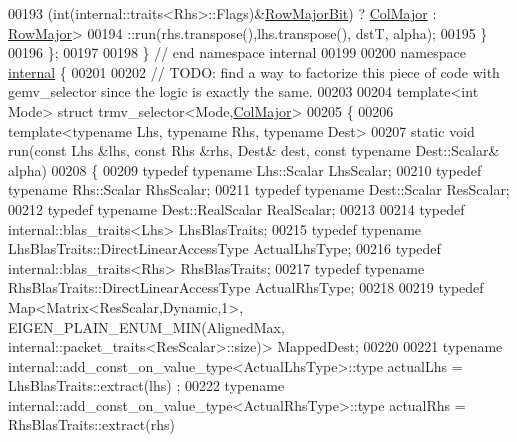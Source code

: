 \begin{DoxyCode}
00193                             (int(internal::traits<Rhs>::Flags)&\hyperlink{group__flags_gae4f56c2a60bbe4bd2e44c5b19cbe8762}{RowMajorBit}) ? 
      \hyperlink{group__enums_ggaacded1a18ae58b0f554751f6cdf9eb13a0cbd4bdd0abcfc0224c5fcb5e4f6669a}{ColMajor} : \hyperlink{group__enums_ggaacded1a18ae58b0f554751f6cdf9eb13acfcde9cd8677c5f7caf6bd603666aae3}{RowMajor}>
00194             ::run(rhs.transpose(),lhs.transpose(), dstT, alpha);
00195   \}
00196 \};
00197 
00198 \} \textcolor{comment}{// end namespace internal}
00199 
00200 \textcolor{keyword}{namespace }\hyperlink{namespaceinternal}{internal} \{
00201 
00202 \textcolor{comment}{// TODO: find a way to factorize this piece of code with gemv\_selector since the logic is exactly the same.}
00203   
00204 \textcolor{keyword}{template}<\textcolor{keywordtype}{int} Mode> \textcolor{keyword}{struct }trmv\_selector<Mode,\hyperlink{group__enums_ggaacded1a18ae58b0f554751f6cdf9eb13a0cbd4bdd0abcfc0224c5fcb5e4f6669a}{ColMajor}>
00205 \{
00206   \textcolor{keyword}{template}<\textcolor{keyword}{typename} Lhs, \textcolor{keyword}{typename} Rhs, \textcolor{keyword}{typename} Dest>
00207   \textcolor{keyword}{static} \textcolor{keywordtype}{void} run(\textcolor{keyword}{const} Lhs &lhs, \textcolor{keyword}{const} Rhs &rhs, Dest& dest, \textcolor{keyword}{const} \textcolor{keyword}{typename} Dest::Scalar& alpha)
00208   \{
00209     \textcolor{keyword}{typedef} \textcolor{keyword}{typename} Lhs::Scalar      LhsScalar;
00210     \textcolor{keyword}{typedef} \textcolor{keyword}{typename} Rhs::Scalar      RhsScalar;
00211     \textcolor{keyword}{typedef} \textcolor{keyword}{typename} Dest::Scalar     ResScalar;
00212     \textcolor{keyword}{typedef} \textcolor{keyword}{typename} Dest::RealScalar RealScalar;
00213     
00214     \textcolor{keyword}{typedef} internal::blas\_traits<Lhs> LhsBlasTraits;
00215     \textcolor{keyword}{typedef} \textcolor{keyword}{typename} LhsBlasTraits::DirectLinearAccessType ActualLhsType;
00216     \textcolor{keyword}{typedef} internal::blas\_traits<Rhs> RhsBlasTraits;
00217     \textcolor{keyword}{typedef} \textcolor{keyword}{typename} RhsBlasTraits::DirectLinearAccessType ActualRhsType;
00218     
00219     \textcolor{keyword}{typedef} Map<Matrix<ResScalar,Dynamic,1>, EIGEN\_PLAIN\_ENUM\_MIN(AlignedMax,
      internal::packet\_traits<ResScalar>::size)> MappedDest;
00220 
00221     \textcolor{keyword}{typename} internal::add\_const\_on\_value\_type<ActualLhsType>::type actualLhs = LhsBlasTraits::extract(lhs)
      ;
00222     \textcolor{keyword}{typename} internal::add\_const\_on\_value\_type<ActualRhsType>::type actualRhs = RhsBlasTraits::extract(rhs)

\end{DoxyCode}
